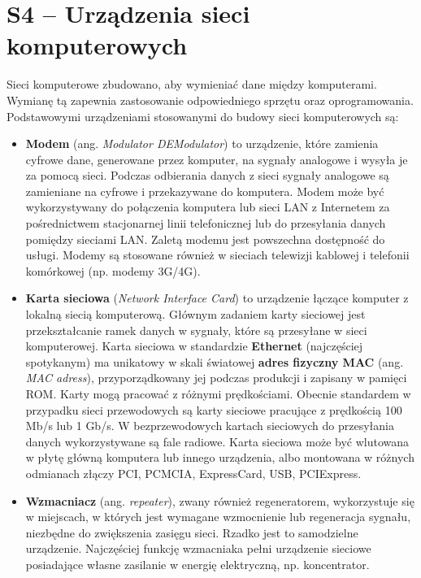 \section{S4 -- Urządzenia sieci komputerowych}

Sieci komputerowe zbudowano, aby wymieniać dane między komputerami. Wymianę tą zapewnia zastosowanie odpowiedniego sprzętu oraz oprogramowania. Podstawowymi urządzeniami stosowanymi do budowy sieci komputerowych są:

\begin{itemize}
	\setlength\itemsep{1pt}
	\item \textbf{Modem} (ang. \textit{Modulator DEModulator}) to urządzenie, które zamienia cyfrowe dane, generowane przez komputer, na sygnały analogowe i wysyła je za pomocą sieci. Podczas odbierania danych z sieci sygnały analogowe są zamieniane na cyfrowe i przekazywane do komputera. Modem może być wykorzystywany do połączenia komputera lub sieci LAN z Internetem za pośrednictwem stacjonarnej linii telefonicznej lub do przesyłania danych pomiędzy sieciami LAN. Zaletą modemu jest powszechna dostępność do usługi. Modemy są stosowane również w sieciach telewizji kablowej i telefonii komórkowej (np. modemy 3G/4G).

	\item \textbf{Karta sieciowa} (\textit{Network Interface Card}) to urządzenie łączące komputer z lokalną sie­cią komputerową. Głównym zadaniem karty sieciowej jest przekształcanie ramek danych w sygnały, które są przesyłane w sieci komputerowej. Karta sieciowa w standardzie \textbf{Ethernet} (najczęściej spotykanym) ma unikatowy w skali światowej \textbf{adres fizyczny MAC} (ang. \textit{MAC adress}), przyporządkowany jej podczas produkcji i zapisany w pamięci ROM. Karty mogą pracować z różnymi prędkościami. Obecnie standardem w przypadku sieci przewodowych są karty sieciowe pracujące z prędkością 100 Mb/s lub 1 Gb/s. W bezprzewodowych kartach sieciowych do przesyłania danych wykorzystywane są fale radiowe. Karta sieciowa może być wlutowana w płytę główną komputera lub innego urządzenia, albo montowana w różnych odmianach złączy PCI, PCMCIA, ExpressCard, USB, PCIExpress.

	\item \textbf{Wzmacniacz} (ang. \textit{repeater}), zwany również regeneratorem, wykorzystuje się w miejscach, w których jest wymagane wzmocnienie lub regeneracja sygnału, niezbędne do zwiększenia zasięgu sieci. Rzadko jest to samodzielne urządzenie. Najczęściej funkcję wzmacniaka pełni urządzenie sieciowe posiadające własne zasilanie w energię elektryczną, np. koncentrator.


\end{itemize}
